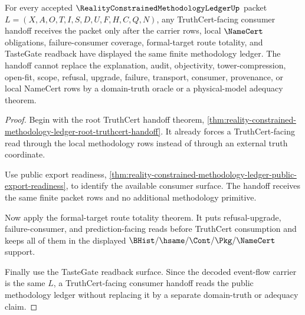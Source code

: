 \begin{theorem}
\label{thm:reality-constrained-methodology-ledger-truthcert-consumer-handoff}
For every accepted $\RealityConstrainedMethodologyLedgerUp$ packet
$L=(X,A,O,T,I,S,D,U,F,H,C,Q,N)$, any TruthCert-facing consumer handoff receives
the packet only after the carrier rows, local $\NameCert$ obligations,
failure-consumer coverage, formal-target route totality, and TasteGate
readback have displayed the same finite methodology ledger. The handoff cannot
replace the explanation, audit, objectivity, tower-compression, open-fit,
scope, refusal, upgrade, failure, transport, consumer, provenance, or local
NameCert rows by a domain-truth oracle or a physical-model adequacy theorem.
\end{theorem}
\begin{proof}
Begin with the root TruthCert handoff theorem,
\autoref{thm:reality-constrained-methodology-ledger-root-truthcert-handoff}.
It already forces a TruthCert-facing read through the local methodology rows
instead of through an external truth coordinate.

Use public export readiness,
\autoref{thm:reality-constrained-methodology-ledger-public-export-readiness},
to identify the available consumer surface. The handoff receives the same
finite packet rows and no additional methodology primitive.

Now apply the formal-target route totality theorem. It puts refusal-upgrade,
failure-consumer, and prediction-facing reads before TruthCert consumption and
keeps all of them in the displayed $\BHist/\hsame/\Cont/\Pkg/\NameCert$
support.

Finally use the TasteGate readback surface. Since the decoded event-flow
carrier is the same $L$, a TruthCert-facing consumer handoff reads the public
methodology ledger without replacing it by a separate domain-truth or adequacy
claim.
\end{proof}

